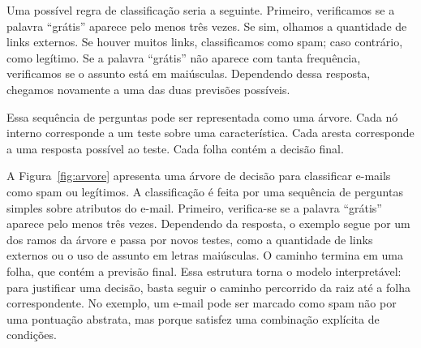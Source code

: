 \documentclass[12pt,a4paper]{article}
\begin{document}
Uma possível regra de classificação seria a seguinte. Primeiro, verificamos se a palavra ``grátis'' aparece pelo menos três vezes. Se sim, olhamos a quantidade de links externos. Se houver muitos links, classificamos como spam; caso contrário, como legítimo. Se a palavra ``grátis'' não aparece com tanta frequência, verificamos se o assunto está em maiúsculas. Dependendo dessa resposta, chegamos novamente a uma das duas previsões possíveis.

Essa sequência de perguntas pode ser representada como uma árvore. Cada nó interno corresponde a um teste sobre uma característica. Cada aresta corresponde a uma resposta possível ao teste. Cada folha contém a decisão final.

A Figura~\ref{fig:arvore} apresenta uma árvore de decisão para classificar e-mails como spam ou legítimos. A classificação é feita por uma sequência de perguntas simples sobre atributos do e-mail. Primeiro, verifica-se se a palavra ``grátis'' aparece pelo menos três vezes. Dependendo da resposta, o exemplo segue por um dos ramos da árvore e passa por novos testes, como a quantidade de links externos ou o uso de assunto em letras maiúsculas. O caminho termina em uma folha, que contém a previsão final. Essa estrutura torna o modelo interpretável: para justificar uma decisão, basta seguir o caminho percorrido da raiz até a folha correspondente. No exemplo, um e-mail pode ser marcado como spam não por uma pontuação abstrata, mas porque satisfez uma combinação explícita de condições.
\end{document}
